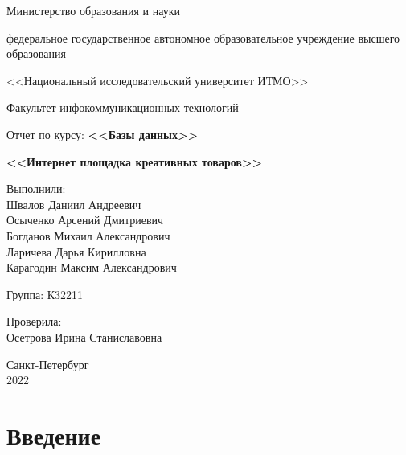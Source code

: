 \documentclass[a4paper,14pt]{extarticle}
\begin{document}
\begin{titlepage}
    \vspace{0pt plus2fill}
    \noindent

    \vspace{0pt plus6fill}
    \begin{center}
        Министерство образования и науки

        федеральное государственное автономное образовательное учреждение высшего образования

        <<Национальный исследовательский университет ИТМО>>

        Факультет инфокоммуникационных технологий

        \vspace{0pt plus8fill}

        Отчет по курсу: \textbf{<<Базы данных>>}

        \textbf{<<Интернет площадка креативных товаров>>}
    \end{center}

    \vspace{0pt plus8fill}
    \begin{flushright}
        Выполнили: \\
        Швалов Даниил Андреевич \\
        Осыченко Арсений Дмитриевич \\
        Богданов Михаил Александрович \\
        Ларичева Дарья Кирилловна \\
        Карагодин Максим Александрович

        Группа: К32211

        Проверила: \\
        Осетрова Ирина Станиславовна
    \end{flushright}

    \vspace{0pt plus5fill}
    \begin{center}
        Санкт-Петербург \\ 2022
    \end{center}
\end{titlepage}

\setcounter{page}{2}

\tableofcontents
\newpage

\section{Введение}
\end{document}
